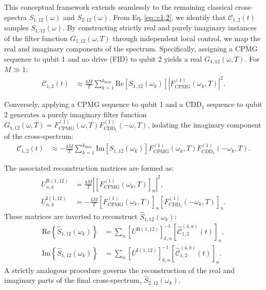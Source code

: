 \documentclass[%
 reprint,
superscriptaddress,
 amsmath,amssymb,
 aps,
pra,
]{revtex4-2}
\begin{document}
This conceptual framework extends seamlessly to the remaining classical cross-spectra $S_{1,12}(\omega)$ and $S_{2,12}(\omega)$. From Eq.\,\eqref{eq::c1,2}, we identify that $\mathcal{C}_{1,2}(t)$ samples $S_{1,12}(\omega)$. By constructing strictly real and purely imaginary instances of the filter function $G_{1,12}(\omega,T)$ through independent local control, we map the real and imaginary components of the spectrum. Specifically, assigning a CPMG sequence to qubit 1 and no drive (FID) to qubit 2 yields a real $G_{1,12}(\omega,T)$. For $M\gg1$:
\begin{align}
    \mathcal{C}_{1,2}(t)&\approx\frac{4M}{T}\sum_{k=1}^{k_{\max}}\text{Re}\left[S_{1,12}(\omega_k)\right]\left|F^{(1)}_{\text{CPMG}}(\omega_k,T)\right|^2.
\end{align}
\begin{widetext}
Conversely, applying a CPMG sequence to qubit 1 and a $\text{CDD}_1$ sequence to qubit 2 generates a purely imaginary filter function $G_{1,12}(\omega, T)=F^{(1)}_{\text{CPMG}}(\omega, T)F^{(1)}_{\text{CDD}_1}(-\omega, T)$, isolating the imaginary component of the cross-spectrum:
\begin{align}
    \mathcal{C}_{1,2}(t)&\approx-\frac{4 M}{T}\sum_{k=1}^{k_{\max}}\text{Im}\left[S_{1,12}(\omega_k)\right]F^{(1)}_{\text{CPMG}}(\omega_k, T)F^{(1)}_{\text{CDD}_1}(-\omega_k, T).
\end{align}
\end{widetext}
The associated reconstruction matrices are formed as:
\begin{align}
    U^{\text{R}(1,12)}_{n,k}&=\frac{4M}{T}\left|\left[F^{(1)}_{\text{CPMG}}(\omega_k,T)\right]_n\right|^2,\\
    U^{\text{I}(1,12)}_{n,k}&=-\frac{4M}{T}\left[F^{(1)}_{\text{CPMG}}(\omega_k, T)\right]_n\left[F^{(1)}_{\text{CDD}_1}(-\omega_k, T)\right]_n.
\end{align}
These matrices are inverted to reconstruct $\hat{S}_{1,12}(\omega_k)$:
\begin{align}
    \text{Re}\left\{\hat{S}_{1,12}(\omega_k)\right\}&=\sum_n\left[U^{\text{R}(1,12)}\right]^{-1}_{k,n}\left[\hat{\mathcal{C}}_{1,2}^{(4.\,a)}(t)\right]_n,\\
    \text{Im}\left\{\hat{S}_{1,12}(\omega_k)\right\}&=\sum_n\left[U^{\text{I}(1,12)}\right]^{-1}_{k,n}\left[\hat{\mathcal{C}}_{1,2}^{(4.\,b)}(t)\right]_n.
\end{align}
A strictly analogous procedure governs the reconstruction of the real and imaginary parts of the final cross-spectrum, $\hat{S}_{2,12}(\omega_k)$.
\end{document}
